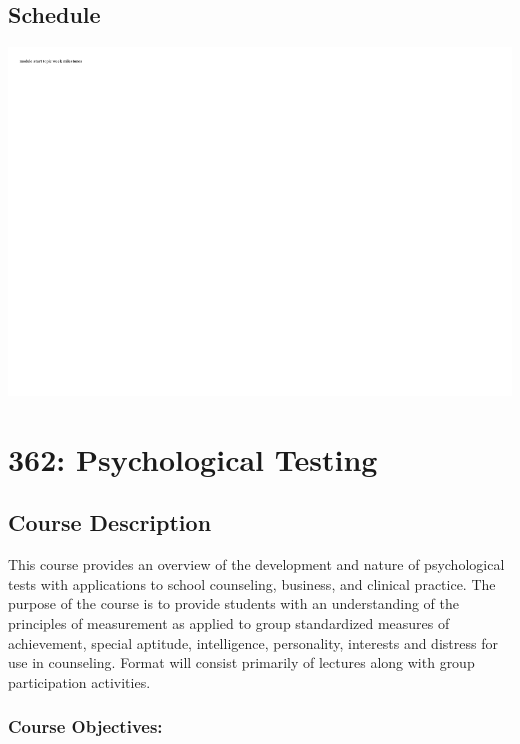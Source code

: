 \hypertarget{schedule-1}{%
\section*{Schedule}\label{schedule-1}}


\includegraphics{0202_stats_files/figure-latex/unnamed-chunk-2-1.pdf}

\hypertarget{testing}{%
\chapter*{362: Psychological Testing}\label{testing}}


\hypertarget{course-description-2}{%
\section*{Course Description}\label{course-description-2}}


This course provides an overview of the development and nature of psychological tests with applications to school counseling, business, and clinical practice. The purpose of the course is to provide students with an understanding of the principles of measurement as applied to group standardized measures of achievement, special aptitude, intelligence, personality, interests and distress for use in counseling. Format will consist primarily of lectures along with group participation activities.

\hypertarget{course-objectives}{%
\subsection*{Course Objectives:}\label{course-objectives}}


